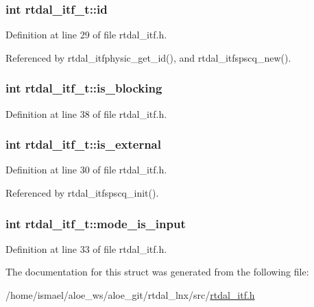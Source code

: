 \hypertarget{structrtdal__itf__t_a454450582d66e41b8d7388cc00979227}{
\subsubsection[{id}]{\setlength{\rightskip}{0pt plus 5cm}int rtdal\-\_\-itf\-\_\-t\-::id}}\label{structrtdal__itf__t_a454450582d66e41b8d7388cc00979227}


Definition at line 29 of file rtdal\-\_\-itf.\-h.



Referenced by rtdal\-\_\-itfphysic\-\_\-get\-\_\-id(), and rtdal\-\_\-itfspscq\-\_\-new().

\hypertarget{structrtdal__itf__t_a46040cf579288e274af70c0f517ba70a}{
\subsubsection[{is\-\_\-blocking}]{\setlength{\rightskip}{0pt plus 5cm}int rtdal\-\_\-itf\-\_\-t\-::is\-\_\-blocking}}\label{structrtdal__itf__t_a46040cf579288e274af70c0f517ba70a}


Definition at line 38 of file rtdal\-\_\-itf.\-h.

\hypertarget{structrtdal__itf__t_a7aa5980c8e478bc1ea1496a0be71091e}{
\subsubsection[{is\-\_\-external}]{\setlength{\rightskip}{0pt plus 5cm}int rtdal\-\_\-itf\-\_\-t\-::is\-\_\-external}}\label{structrtdal__itf__t_a7aa5980c8e478bc1ea1496a0be71091e}


Definition at line 30 of file rtdal\-\_\-itf.\-h.



Referenced by rtdal\-\_\-itfspscq\-\_\-init().

\hypertarget{structrtdal__itf__t_afda665341072e66ef18a5b90e39f816b}{
\subsubsection[{mode\-\_\-is\-\_\-input}]{\setlength{\rightskip}{0pt plus 5cm}int rtdal\-\_\-itf\-\_\-t\-::mode\-\_\-is\-\_\-input}}\label{structrtdal__itf__t_afda665341072e66ef18a5b90e39f816b}


Definition at line 33 of file rtdal\-\_\-itf.\-h.



The documentation for this struct was generated from the following file\-:\begin{DoxyCompactItemize}
\item 
/home/ismael/aloe\-\_\-ws/aloe\-\_\-git/rtdal\-\_\-lnx/src/\hyperlink{rtdal__itf_8h}{rtdal\-\_\-itf.\-h}\end{DoxyCompactItemize}
